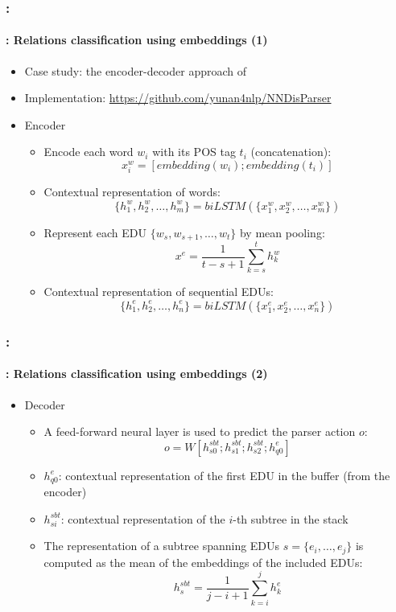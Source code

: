 \documentclass[xcolor=table]{beamer}
\begin{document}
\begin{frame}
	\frametitle{\insertshortsubtitle: \insertsection}
	\framesubtitle{\insertsubsection: Relations classification using embeddings (1)}
	
	\begin{itemize}
		\item Case study: the encoder-decoder approach of \cite{2018-yu-al}
		\item Implementation: \url{https://github.com/yunan4nlp/NNDisParser}
		\item Encoder 
		\begin{itemize}
			\item Encode each word $w_i$ with its POS tag $t_i$ (concatenation):
			\[
			x_i^w = [embedding(w_i); embedding(t_i)]
			\]
			\item Contextual representation of words:
			\[
			\{h_1^w, h_2^w, \ldots, h_m^w \} = biLSTM(\{x_1^w, x_2^w, \ldots, x_m^w \})
			\]
			\item Represent each EDU $\{w_s, w_{s+1}, \ldots, w_t\}$ by mean pooling:
			\[
			x^e = \frac{1}{t-s+1} \sum_{k=s}^{t} h_k^w
			\]
			\item Contextual representation of sequential EDUs:
			\[
			\{h_1^e, h_2^e, \ldots, h_n^e \} = biLSTM(\{x_1^e, x_2^e, \ldots, x_n^e \})
			\]
		\end{itemize}
	\end{itemize}
	
\end{frame}

\begin{frame}
	\frametitle{\insertshortsubtitle: \insertsection}
	\framesubtitle{\insertsubsection: Relations classification using embeddings (2)}
	
	\begin{itemize}
		\item Decoder 
		\begin{itemize}
			\item A feed-forward neural layer is used to predict the parser action $o$:
			\[
			o = W [h_{s0}^{sbt}; h_{s1}^{sbt}; h_{s2}^{sbt}; h_{q0}^{e}]
			\]
			\item $h_{q0}^{e}$: contextual representation of the first EDU in the buffer (from the encoder)
			\item $h_{si}^{sbt}$: contextual representation of the $i$-th subtree in the stack
			\item The representation of a subtree spanning EDUs $s = \{e_i, \ldots, e_j\}$ is computed as the mean of the embeddings of the included EDUs:
			\[
			h_{s}^{sbt} = \frac{1}{j-i+1} \sum_{k=i}^{j} h_k^e
			\]
		\end{itemize}
	\end{itemize}
	
\end{frame}
\end{document}
